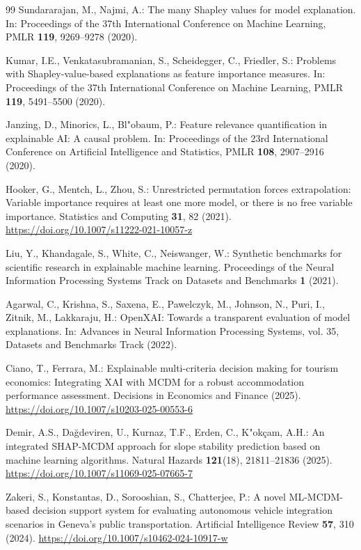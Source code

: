 \documentclass[runningheads]{llncs}
\begin{document}
\begin{thebibliography}{99}
Sundararajan, M., Najmi, A.:
The many Shapley values for model explanation.
In: Proceedings of the 37th International Conference on Machine Learning,
PMLR \textbf{119}, 9269--9278 (2020).

Kumar, I.E., Venkatasubramanian, S., Scheidegger, C., Friedler, S.:
Problems with Shapley-value-based explanations as feature importance measures.
In: Proceedings of the 37th International Conference on Machine Learning,
PMLR \textbf{119}, 5491--5500 (2020).

Janzing, D., Minorics, L., Bl{"o}baum, P.:
Feature relevance quantification in explainable AI: A causal problem.
In: Proceedings of the 23rd International Conference on Artificial Intelligence and Statistics,
PMLR \textbf{108}, 2907--2916 (2020).

Hooker, G., Mentch, L., Zhou, S.:
Unrestricted permutation forces extrapolation: Variable importance requires at least one more
model, or there is no free variable importance.
Statistics and Computing \textbf{31}, 82 (2021).
\url{https://doi.org/10.1007/s11222-021-10057-z}

Liu, Y., Khandagale, S., White, C., Neiswanger, W.:
Synthetic benchmarks for scientific research in explainable machine learning.
Proceedings of the Neural Information Processing Systems Track on Datasets and Benchmarks
\textbf{1} (2021).

Agarwal, C., Krishna, S., Saxena, E., Pawelczyk, M., Johnson, N., Puri, I., Zitnik, M.,
Lakkaraju, H.:
OpenXAI: Towards a transparent evaluation of model explanations.
In: Advances in Neural Information Processing Systems, vol. 35, Datasets and Benchmarks Track
(2022).

Ciano, T., Ferrara, M.:
Explainable multi-criteria decision making for tourism economics: Integrating XAI with MCDM for
a robust accommodation performance assessment.
Decisions in Economics and Finance (2025).
\url{https://doi.org/10.1007/s10203-025-00553-6}

Demir, A.S., Da{\u g}deviren, U., Kurnaz, T.F., Erden, C., K{"o}k{\c c}am, A.H.:
An integrated SHAP-MCDM approach for slope stability prediction based on machine learning
algorithms.
Natural Hazards \textbf{121}(18), 21811--21836 (2025).
\url{https://doi.org/10.1007/s11069-025-07665-7}

Zakeri, S., Konstantas, D., Sorooshian, S., Chatterjee, P.:
A novel ML-MCDM-based decision support system for evaluating autonomous vehicle integration
scenarios in Geneva's public transportation.
Artificial Intelligence Review \textbf{57}, 310 (2024).
\url{https://doi.org/10.1007/s10462-024-10917-w}


\end{thebibliography}
\end{document}
